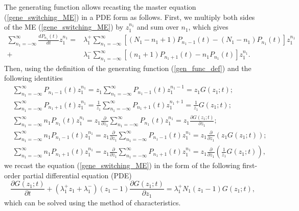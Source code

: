 \documentclass[a4paper, 11pt]{article}
\begin{document}
The generating function allows recasting the master equation (\ref{gene_switching_ME}) in a PDE form as follows. First, we multiply both sides of the ME (\ref{gene_switching_ME}) by $z_1^{n_1}$ and sum over $n_1$, which gives
\begin{equation*}
  \begin{split}
    \sum_{n_1=-\infty}^{\infty}\frac{dP_{n_1}(t)}{dt}z_1^{n_1} = &\lambda_1^+\sum_{n_1=-\infty}^{\infty}\left[(N_1-n_1+1)P_{n_1-1}(t) - (N_1-n_1)P_{n_1}(t)\right]z_1^{n_1}\\
    + & \lambda_1^-\sum_{n_1=-\infty}^{\infty}\left[(n_1+1)P_{n_1+1}(t) - n_1P_{n_1}(t)\right]z_1^{n_1}.
  \end{split}
\end{equation*}
Then, using the definition of the generating function (\ref{gen_func_def}) and the following identities
\begin{align*}
  & \sum_{n_1=-\infty}^{\infty}P_{n_1-1}(t)z_1^{n_1} = z_1\sum_{n_1=-\infty}^{\infty}P_{n_1-1}(t)z_1^{n_1-1} = z_1G(z_1;t);\\
  & \sum_{n_1=-\infty}^{\infty}P_{n_1+1}(t)z_1^{n_1} = \frac{1}{z_1}\sum_{n_1=-\infty}^{\infty}P_{n_1+1}(t)z_1^{n_1+1} = \frac{1}{z_1}G(z_1;t);\\
  & \sum_{n_1=-\infty}^{\infty}n_1P_{n_1}(t)z_1^{n_1} = z_1\frac{\partial}{\partial z_1}\sum_{n_1=-\infty}^{\infty}P_{n_1}(t)z_1^{n_1} = z_1\frac{\partial G(z_1; t)}{\partial z_1};\\
  & \sum_{n_1=-\infty}^{\infty}n_1P_{n_1-1}(t)z_1^{n_1} = z_1\frac{\partial}{\partial z_1}\sum_{n_1=-\infty}^{\infty}P_{n_1-1}(t)z_1^{n_1} = z_1\frac{\partial}{\partial z_1} \left(z_1G(z_1; t)\right);\\
  & \sum_{n_1=-\infty}^{\infty}n_1P_{n_1+1}(t)z_1^{n_1} = z_1\frac{\partial}{\partial z_1}\sum_{n_1=-\infty}^{\infty}P_{n_1+1}(t)z_1^{n_1} = z_1\frac{\partial}{\partial z_1} \left(\frac{1}{z_1}G(z_1; t)\right),
\end{align*}
we recast the equation (\ref{gene_switching_ME}) in the form of the following first-order partial differential equation (PDE)
\begin{equation} \label{gene_switching_PDE}
  \frac{\partial G(z_1;t)}{\partial t} + (\lambda_1^+z_1 + \lambda_1^-)(z_1-1)\frac{\partial G(z_1;t)}{\partial z_1} = \lambda_1^+N_1(z_1-1)G(z_1;t),
\end{equation}
which can be solved using the method of characteristics.
\end{document}
